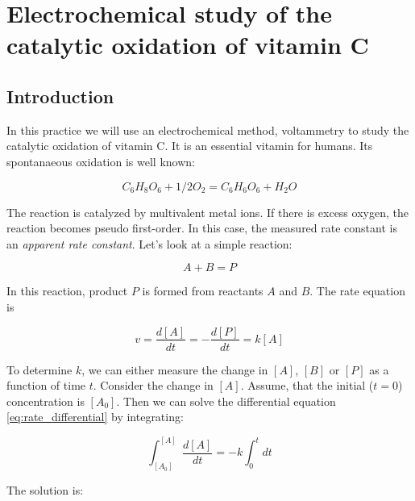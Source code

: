 \fancyhead[LO,RE]{\thesection}
\fancyfoot[LE,RO]{\thepage}

\section{Electrochemical study of the catalytic oxidation of vitamin C}
\subsection{Introduction}
In this practice we will use an electrochemical method, voltammetry to study the catalytic oxidation of vitamin C. It is an essential vitamin for humans. Its spontanaeous oxidation is well known:

\begin{equation}
\label{eq:divider}
        C_6 H_8 O_6
	+
	1/2 O_2
        =
	C_6 H_6 O_6
	+ H_2O
\end{equation}

The reaction is catalyzed by multivalent metal ions. If there is excess oxygen, the reaction becomes pseudo first-order. In this case, the measured rate constant is an \emph{apparent rate constant}. Let's look at a simple reaction:

\begin{equation}
\label{eq:divider}
        A
        +
        B
        =
        P
\end{equation}

In this reaction, product $P$ is formed from reactants $A$ and $B$. The rate equation is

\begin{equation}
\label{eq:rate_differential}
	v
	=
	\frac{d[A]}{dt}
	=
	-\frac{d[P]}{dt}
	=
	k[A]
\end{equation}

To determine $k$, we can either measure the change in $[A]$, $[B]$ or $[P]$ as a function of time $t$. Consider the change in $[A]$. Assume, that the initial ($t = 0$) concentration is $[A_0]$. Then we can solve the differential equation \ref{eq:rate_differential} by integrating:

\begin{equation}
\label{eq:rate}
        \int_{[A_0]}^{[A]}
        \frac{d[A]}{dt}
        =
        -k \int_0^t
	dt
\end{equation}
 
The solution is:

